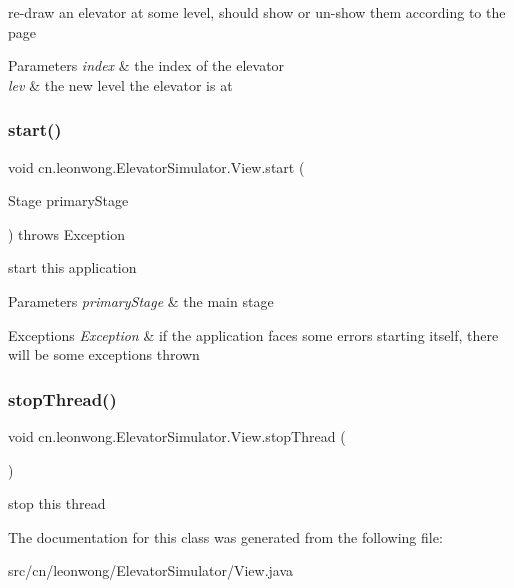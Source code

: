 re-\/draw an elevator at some level, should show or un-\/show them according to the page 
\begin{DoxyParams}{Parameters}
{\em index} & the index of the elevator \\
\hline
{\em lev} & the new level the elevator is at \\
\hline
\end{DoxyParams}
\mbox{\label{classcn_1_1leonwong_1_1_elevator_simulator_1_1_view_a068904406a0d25168fedd721dee528ac}} 
\subsubsection{\texorpdfstring{start()}{start()}}
{\footnotesize\ttfamily void cn.\+leonwong.\+Elevator\+Simulator.\+View.\+start (\begin{DoxyParamCaption}\item[{Stage}]{primary\+Stage }\end{DoxyParamCaption}) throws Exception}

start this application 
\begin{DoxyParams}{Parameters}
{\em primary\+Stage} & the main stage \\
\hline
\end{DoxyParams}

\begin{DoxyExceptions}{Exceptions}
{\em Exception} & if the application faces some errors starting itself, there will be some exceptions thrown \\
\hline
\end{DoxyExceptions}
\mbox{\label{classcn_1_1leonwong_1_1_elevator_simulator_1_1_view_a0cea78020cab972bf8370aff8bed9eea}} 
\subsubsection{\texorpdfstring{stop\+Thread()}{stopThread()}}
{\footnotesize\ttfamily void cn.\+leonwong.\+Elevator\+Simulator.\+View.\+stop\+Thread (\begin{DoxyParamCaption}{ }\end{DoxyParamCaption})}

stop this thread 

The documentation for this class was generated from the following file\+:\begin{DoxyCompactItemize}
\item 
src/cn/leonwong/\+Elevator\+Simulator/View.\+java\end{DoxyCompactItemize}

